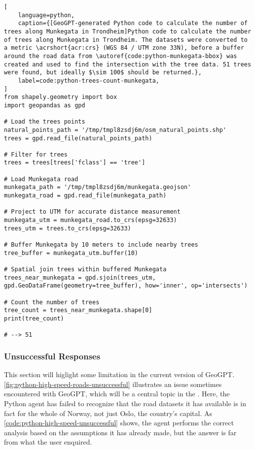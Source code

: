 \begin{lstlisting}[
    language=python,
    caption={[GeoGPT-generated Python code to calculate the number of trees along Munkegata in Trondheim]Python code to calculate the number of trees along Munkegata in Trondheim. The datasets were converted to a metric \acrshort{acr:crs} (WGS 84 / UTM zone 33N), before a buffer around the road data from \autoref{code:python-munkegata-bbox} was created and used to find the intersection with the tree data. 51 trees were found, but ideally $\sim 100$ should be returned.},
    label=code:python-trees-count-munkegata,
]
from shapely.geometry import box
import geopandas as gpd

# Load the trees points
natural_points_path = '/tmp/tmpl8zsdj6m/osm_natural_points.shp'
trees = gpd.read_file(natural_points_path)

# Filter for trees
trees = trees[trees['fclass'] == 'tree']

# Load Munkegata road
munkegata_path = '/tmp/tmpl8zsdj6m/munkegata.geojson'
munkegata_road = gpd.read_file(munkegata_path)

# Project to UTM for accurate distance measurement
munkegata_utm = munkegata_road.to_crs(epsg=32633)
trees_utm = trees.to_crs(epsg=32633)

# Buffer Munkegata by 10 meters to include nearby trees
tree_buffer = munkegata_utm.buffer(10)

# Spatial join trees within buffered Munkegata
trees_near_munkegata = gpd.sjoin(trees_utm, gpd.GeoDataFrame(geometry=tree_buffer), how='inner', op='intersects')

# Count the number of trees
tree_count = trees_near_munkegata.shape[0]
print(tree_count)

# --> 51
\end{lstlisting}

\FloatBarrier
\subsubsection{Unsuccessful Responses}
\label{subsubsec:unsuccessful-responses}

This section will higlight some limitation in the current version of GeoGPT. \autoref{fig:python-high-speed-roads-unsuccessful} illustrates an issue sometimes encountered with GeoGPT, which will be a central topic in the . Here, the Python agent has failed to recognize that the road datasets it has available is in fact for the whole of Norway, not just Oslo, the country's capital. As \autoref{code:python-high-speed-unsuccessful} shows, the agent performs the correct analysis based on the assumptions it has already made, but the answer is far from what the user enquired.

